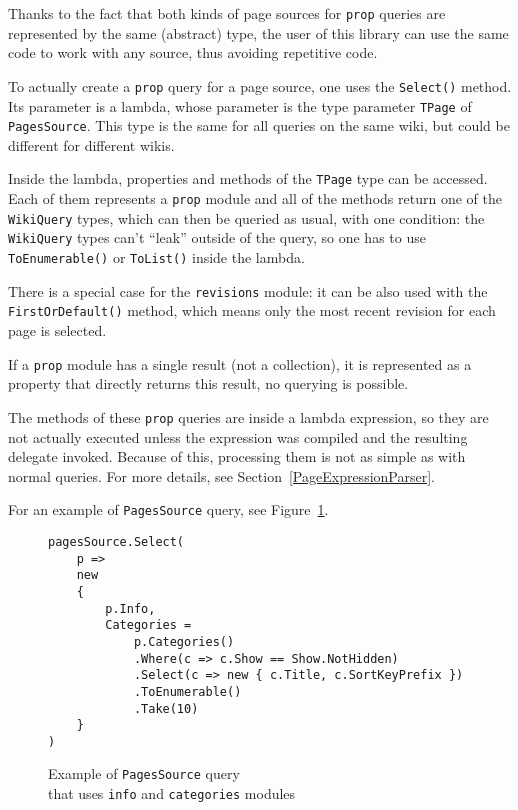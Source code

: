 Thanks to the fact that both kinds of page sources for \texttt{prop} queries are represented by the same
(abstract) type, the user of this library can use the same code to work with any source,
thus avoiding repetitive code.

\medskip

To actually create a \texttt{prop} query for a page source, one uses the \lstinline{Select()} method.
Its parameter is a lambda, whose parameter is the type parameter \lstinline{TPage} of \lstinline{PagesSource}.
This type is the same for all queries on the same wiki, but could be different for different wikis.

Inside the lambda, properties and methods of the \lstinline{TPage} type can be accessed.
Each of them represents a \texttt{prop} module and all of the methods return one of the \lstinline{WikiQuery} types,
which can then be queried as usual, with one condition:
the \lstinline{WikiQuery} types can't ``leak'' outside of the query, so one has to use \lstinline{ToEnumerable()} or \lstinline{ToList()} inside the lambda.

There is a special case for the \texttt{revisions} module:
it can be also used with the \lstinline{FirstOrDefault()} method,
which means only the most recent revision for each page is selected.

If a \texttt{prop} module has a single result (not a collection), it is represented as a property
that directly returns this result, no querying is possible.

\medskip

The methods of these \texttt{prop} queries are inside a lambda expression,
so they are not actually executed unless the expression was compiled and the resulting delegate invoked.
Because of this, processing them is not as simple as with normal queries.
For more details, see Section~\ref{PageExpressionParser}.

\medskip

For an example of \lstinline{PagesSource} query, see Figure~\ref{PS query}.

\begin{figure}[htbp]

\begin{lstlisting}
pagesSource.Select(
    p =>
    new
    {
        p.Info,
        Categories =
            p.Categories()
            .Where(c => c.Show == Show.NotHidden)
            .Select(c => new { c.Title, c.SortKeyPrefix })
            .ToEnumerable()
            .Take(10)
	}
)
\end{lstlisting}

\caption{Example of \lstinline{PagesSource} query \\ that uses \texttt{info} and \texttt{categories} modules}
\label{PS query}

\end{figure}

